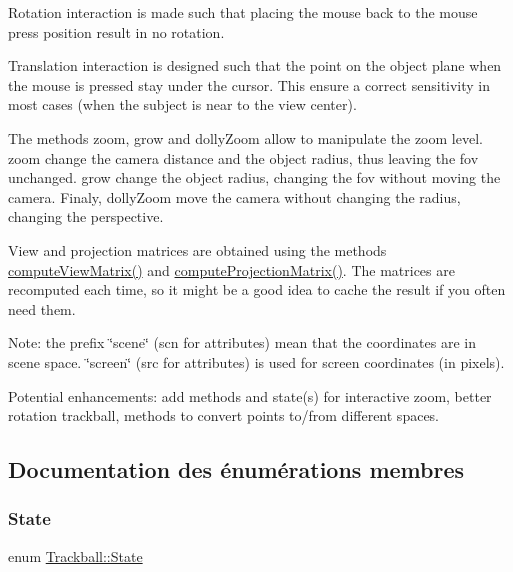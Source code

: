 Rotation interaction is made such that placing the mouse back to the mouse press position result in no rotation.

Translation interaction is designed such that the point on the object plane when the mouse is pressed stay under the cursor. This ensure a correct sensitivity in most cases (when the subject is near to the view center).

The methods zoom, grow and dolly\+Zoom allow to manipulate the zoom level. zoom change the camera distance and the object radius, thus leaving the fov unchanged. grow change the object radius, changing the fov without moving the camera. Finaly, dolly\+Zoom move the camera without changing the radius, changing the perspective.

View and projection matrices are obtained using the methods \hyperlink{class_trackball_acb8ad68c2077f4ff149e501acfe67d50}{compute\+View\+Matrix()} and \hyperlink{class_trackball_a4d156f831f9c5eac08ca40283327fb3d}{compute\+Projection\+Matrix()}. The matrices are recomputed each time, so it might be a good idea to cache the result if you often need them.

Note\+: the prefix \char`\"{}scene\char`\"{} (scn for attributes) mean that the coordinates are in scene space. \char`\"{}screen\char`\"{} (src for attributes) is used for screen coordinates (in pixels).

Potential enhancements\+: add methods and state(s) for interactive zoom, better rotation trackball, methods to convert points to/from different spaces. 

\subsection{Documentation des énumérations membres}
\mbox{\label{class_trackball_a102216413a87cb37801044063a1b05be}} 
\subsubsection{\texorpdfstring{State}{State}}
{\footnotesize\ttfamily enum \hyperlink{class_trackball_a102216413a87cb37801044063a1b05be}{Trackball\+::\+State}}

